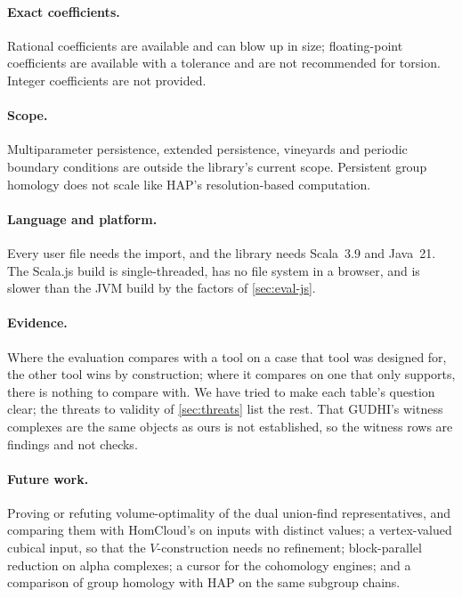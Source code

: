 \paragraph{Exact coefficients.}
Rational coefficients are available and can blow up in size; floating-point coefficients are available with a tolerance
and are not recommended for torsion. Integer coefficients are not provided.

\paragraph{Scope.}
Multiparameter persistence, extended persistence, vineyards and periodic boundary conditions are outside the library's current scope.
Persistent group homology does not scale like HAP's resolution-based computation.

\paragraph{Language and platform.}
Every user file needs the  import, and the library needs Scala~3.9 and Java~21. The Scala.js build
is single-threaded, has no file system in a browser, and is slower than the JVM build by the factors of \cref{sec:eval-js}.

\paragraph{Evidence.}
Where the evaluation compares with a tool on a case that tool was designed for, the other tool wins by construction; where it
compares on one that only \tdaj{} supports, there is nothing to compare with. We have tried to make each table's question
clear; the threats to validity of \cref{sec:threats} list the rest. That GUDHI's witness complexes are the same objects as
ours is not established, so the witness rows are findings and not checks.

\paragraph{Future work.}
Proving or refuting volume-optimality of the dual union-find representatives, and comparing them with HomCloud's on inputs
with distinct values; a vertex-valued cubical input, so that the $V$-construction needs no refinement; block-parallel reduction on alpha
complexes; a cursor for the cohomology engines; and a comparison of group homology with HAP on the same subgroup chains.
